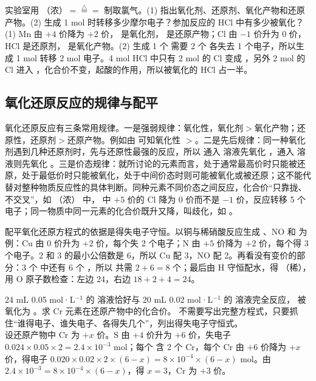 \begin{liti}[基础]
实验室用 （浓）$\overset{\triangle}{=\!=\!=}$ 制取氯气。(1) 指出氧化剂、还原剂、氧化产物和还原产物。(2) 生成 1 mol  时转移多少摩尔电子？参加反应的 HCl 中有多少被氧化？
\tcblower
\jie (1) Mn 由 $+4$ 价降为 $+2$ 价， 是氧化剂， 是还原产物；Cl 由 $-1$ 价升为 0 价，HCl 是还原剂， 是氧化产物。(2) 生成 1 个  需要 2 个  各失去 1 个电子，所以生成 1 mol  转移 2 mol 电子。4 mol HCl 中只有 2 mol 的 Cl 变成 ，另外 2 mol 的 Cl 进入 ，化合价不变，起酸的作用，所以被氧化的 HCl 占一半。
\end{liti}

\subsection{氧化还原反应的规律与配平}
氧化还原反应有三条常用规律。一是强弱规律：氧化性，氧化剂$>$氧化产物；还原性，还原剂$>$还原产物。例如由  可知氧化性 $>$。二是先后规律：同一种氧化剂遇到几种还原剂时，先与还原性最强的反应，所以  通入  溶液先氧化 ，通入  溶液则先氧化 。三是价态规律：就所讨论的元素而言，处于通常最高价时只能被还原，处于最低价时只能被氧化，处于中间价态时则可能被氧化或被还原；这不能代替对整种物质反应性的具体判断。同种元素不同价态之间反应，化合价“只靠拢、不交叉”，如 （浓） 中， 中 $+5$ 价的 Cl 降为 0 价而不是 $-1$ 价，反应转移 5 个电子；同一物质中同一元素的化合价既升又降，叫歧化，如 。

配平氧化还原方程式的依据是得失电子守恒。以铜与稀硝酸反应生成 、NO 和  为例：Cu 由 0 价升为 $+2$ 价，每个失 2 个电子；N 由 $+5$ 价降为 $+2$ 价，每个得 3 个电子。2 和 3 的最小公倍数是 6，所以 Cu 配 3，NO 配 2。再看没有变价的部分：3 个  中还有 6 个 ，所以  共需 $2+6=8$ 个；最后由 H 守恒配水，得 （稀），用 O 原子数检查：左边 24，右边 $18+2+4=24$。

\begin{liti}[典型]
24 mL 0.05 mol·L$^{-1}$ 的  溶液恰好与 20 mL 0.02 mol·L$^{-1}$ 的  溶液完全反应， 被氧化为 。求 Cr 元素在还原产物中的化合价。
\tcblower
\silu 不需要写出完整方程式，只要抓住“谁得电子、谁失电子、各得失几个”，列出得失电子守恒式。\\
\jie 设还原产物中 Cr 为 $+x$ 价。S 由 $+4$ 价升为 $+6$ 价，失电子 $0.024\times0.05\times2=2.4\times10^{-3}$ mol；每个  含 2 个 Cr，每个 Cr 由 $+6$ 价降为 $+x$ 价，得电子 $0.020\times0.02\times2\times(6-x)=8\times10^{-4}\times(6-x)$ mol。由 $2.4\times10^{-3}=8\times10^{-4}\times(6-x)$，得 $x=3$，Cr 为 $+3$ 价。
\end{liti}



